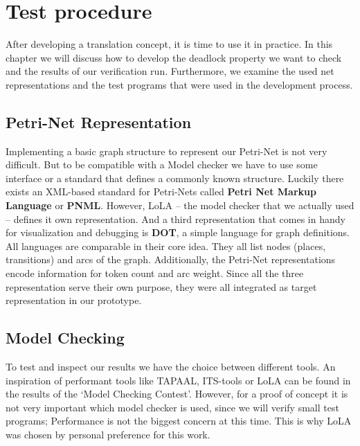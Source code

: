 \chapter{Test procedure}
\label{results}
After developing a translation concept, it is time to use it in practice.
In this chapter we will discuss how to develop the deadlock property we want to check and the results of our verification run.
Furthermore, we examine the used net representations and the test programs that were used in the development process.

\section{Petri-Net Representation}
\label{app_petri}
Implementing a basic graph structure to represent our Petri-Net is not very difficult.
But to be compatible with a Model checker we have to use some interface or a standard that
defines a commonly known structure.
Luckily there exists an XML-based standard for Petri-Nets called \textbf{Petri Net Markup Language}\cite{pnml}\cite{kindler2006petri} or \textbf{PNML}.
However, LoLA -- the model checker that we actually used -- defines it own representation.
And a third representation that comes in handy for visualization and debugging is \textbf{DOT}\cite{koutsofios1996drawing}, a simple language for graph definitions.
All languages are comparable in their core idea.
They all list nodes (places, transitions) and arcs of the graph. 
Additionally, the Petri-Net representations encode information for token count and arc weight.
Since all the three representation serve their own purpose, they were all integrated as target representation in our prototype.

\section{Model Checking}
\label{app_mc}
To test and inspect our results we have the choice between different tools.
An inspiration of performant tools like TAPAAL\cite{tapaal}, ITS-tools\cite{its-tools} or LoLA\cite{lola}\cite{schmidt2000lola} can be found in the results of the `Model Checking Contest'\cite{mcc}.
However, for a proof of concept it is not very important which model checker is used, since we will verify small test programs;
Performance is not the biggest concern at this time.
This is why LoLA was chosen by personal preference for this work.

